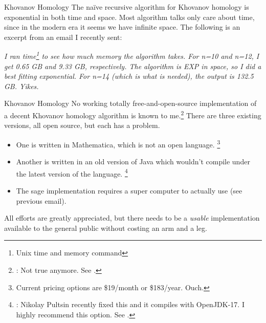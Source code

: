 \documentclass{beamer}
\begin{document}
    \begin{frame}{Khovanov Homology}
        The na\"{i}ve recursive algorithm for Khovanov homology is exponential
        in both time and space. Most algorithm talks only care about time,
        since in the modern era it seems we have infinite space. The following
        is an excerpt from an email I recently sent:
        \begin{flushright}
            \textit{
                I ran time\footnote{Unix time and memory command}
                to see how much memory the algorithm takes.
                For n=10 and n=12, I get 0.65 GB and 9.33 GB, respectively.
                The algorithm is EXP in space, so I did a best fitting
                exponential. For n=14 (which is what is needed), the output is
                132.5 GB. Yikes.
            }
        \end{flushright}
    \end{frame}
    \begin{frame}{Khovanov Homology}
        No working totally free-and-open-source implementation of a decent
        Khovanov homology algorithm is known to me.\footnote{%
            \textbf{\color{red}{Correction}}:
            Not true anymore. See \cite{JavaKhv2}.
        }
        There are three existing
        versions, all open source, but each has a problem.
        \begin{itemize}
            \item
                One is written in Mathematica, which is not an open language.%
                \footnote{%
                    Current pricing options are \$19/month or \$183/year. Ouch.%
                }
            \item
                Another is written in an old version of Java which wouldn't
                compile under the latest version of the language.%
                \footnote{%
                    \textbf{\color{red}{Correction}}:
                    Nikolay Pultsin recently fixed this and it
                    compiles with OpenJDK-17. I highly recommend this option.
                    See \cite{JavaKhv2}.
                }
            \item
                The sage implementation requires a super computer to actually
                use (see previous email).
        \end{itemize}
        All efforts are greatly appreciated, but there needs to be a
        \textit{usable} implementation available to the general public without
        costing an arm and a leg.
    \end{frame}
\end{document}
